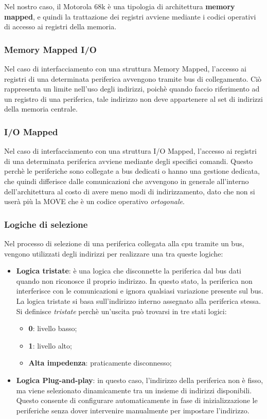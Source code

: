 Nel nostro caso, il Motorola 68k è una tipologia di architettura \textbf{memory mapped}, e quindi la trattazione dei registri avviene mediante i codici operativi di accesso ai registri della memoria. 

\subsubsection{Memory Mapped I/O}
Nel caso di interfacciamento con una struttura Memory Mapped, l'accesso ai registri di una determinata periferica avvengono tramite bus di collegamento. Ciò rappresenta un limite nell'uso degli indirizzi, poichè quando faccio riferimento ad un registro di una periferica, tale indirizzo non deve appartenere al set di indirizzi della memoria centrale.

\subsubsection{I/O Mapped}
Nel caso di interfacciamento con una struttura I/O Mapped, l'accesso ai registri di una determinata periferica avviene mediante degli specifici comandi. Questo perchè le periferiche sono collegate a bus dedicati o hanno una gestione dedicata, che quindi differisce dalle comunicazioni che avvengono in generale all'interno dell'architettura al costo di avere meno modi di indirizzamento, dato che non si userà più la MOVE che è un codice operativo \textit{ortogonale}.

\subsubsection{Logiche di selezione}
Nel processo di selezione di una periferica collegata alla cpu tramite un bus, vengono utilizzati degli indirizzi per realizzare una tra queste logiche:
\begin{itemize}
    \item \textbf{Logica tristate}: è una logica che disconnette la periferica dal bus dati quando non riconosce il proprio indirizzo. In questo stato, la periferica non interferisce con le comunicazioni e ignora qualsiasi variazione presente sul bus. La logica tristate si basa sull'indirizzo interno assegnato alla periferica stessa. Si definisce \textit{tristate} perchè un'uscita può trovarsi in tre stati logici:
    \begin{itemize}
        \item \textbf{0}: livello basso;
        \item \textbf{1}: livello alto;
        \item \textbf{Alta impedenza}: praticamente disconnesso; 
    \end{itemize}
    \item \textbf{Logica Plug-and-play}: in questo caso, l'indirizzo della periferica non è fisso, ma viene selezionato dinamicamente tra un insieme di indirizzi disponibili. Questo consente di configurare automaticamente in fase di inizializzazione le periferiche senza dover intervenire manualmente per impostare l'indirizzo.
\end{itemize}

